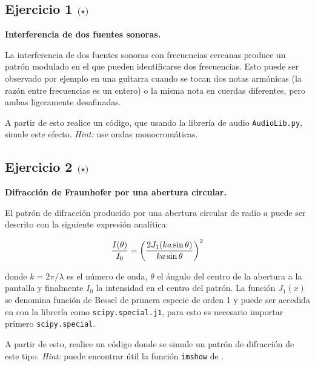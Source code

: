 

\newpage
\subsection*{Ejercicio 1 \large{$\left( \star \right)$}}

\textbf{Interferencia de dos fuentes sonoras.}

La interferencia de dos fuentes sonoras con frecuencias cercanas produce un 
patrón modulado en el que pueden identificarse dos frecuencias. Esto puede
ser observado por ejemplo en una guitarra cuando se tocan dos notas 
armónicas (la razón entre frecuencias es un entero) o la misma nota en 
cuerdas diferentes, pero ambas ligeramente desafinadas. 


A partir de esto realice un código, que usando la librería de audio 
\texttt{AudioLib.py}, simule este efecto. \textit{Hint:} use ondas 
monocromáticas.

\subsection*{Ejercicio 2 \large{$\left( \star \right)$}}

\textbf{Difracción de Fraunhofer por una abertura circular.}

El patrón de difracción producido por una abertura circular de radio $a$ 
puede ser descrito con la siguiente expresión analítica:

\[ \frac{I(\theta)}{I_0} = 
\left( \frac{2 J_1( k a \sin \theta )}{ka \sin \theta} \right)^2 \]


donde $k=2\pi/\lambda$ es el número de onda, $\theta$ el ángulo del centro 
de la abertura a la pantalla y finalmente $I_0$ la intensidad en el centro
del patrón. La función $J_1(x)$ se denomina función de Bessel de primera 
especie de orden 1 y puede ser accedida en \python con la librería \scipy 
como \texttt{scipy.special.j1}, para esto es necesario importar primero 
\texttt{scipy.special}.

A partir de esto, realice un código donde se simule un patrón de 
difracción de este tipo. \textit{Hint:} puede encontrar útil la función 
\texttt{imshow} de \matplotlib.

